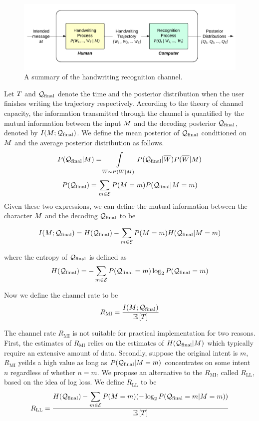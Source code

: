 \documentclass{sigchi}
\begin{document}
\begin{figure}
  \centering
  \includegraphics[width=0.9\columnwidth]{figures/hwr_channel.pdf}
  \caption{A summary of the handwriting recognition channel.}
  \label{fig:hwr_channel}
\end{figure}

Let $T$ and $\mathcal{Q}_{\mathrm{final}}$ denote the time and the posterior
distribution when the user finishes writing the trajectory
respectively.  According to the theory of channel capacity, the
information transmitted through the channel is quantified by the
mutual information between the input $M$ and the decoding
posterior $\mathcal{Q}_{\mathrm{final}}$, denoted by $I(M ; \mathcal{Q}_{\mathrm{final}})$. We
define the mean posterior of $\mathcal{Q}_{\mathrm{final}}$ conditioned on $M$ and
the average posterior distribution as follows.
\[
P(\mathcal{Q}_{\mathrm{final}} | M) =
\int\limits_{\overline{W} \sim P(\overline{W} | M)} { P(\mathcal{Q}_{\mathrm{final}} | \overline{W})
P(\overline{W} | M)} 
\]
\[
P(\mathcal{Q}_{\mathrm{final}})
=
\sum_{m \in \mathcal{E}} 
P(M = m) P(\mathcal{Q}_{\mathrm{final}} | M = m)
\]
Given these two expressions, we can define the mutual information
between the character $M$ and the decoding $\mathcal{Q}_{\mathrm{final}}$ to be 
{
\small
\[
I(M ; \mathcal{Q}_{\mathrm{final}}) = 
H(\mathcal{Q}_{\mathrm{final}})
- \sum_{m \in \mathcal{E}} P(M = m) H(\mathcal{Q}_{\mathrm{final}} | M = m)
\]

}
where the entropy of $\mathcal{Q}_{\mathrm{final}}$ is defined as
\[
H(\mathcal{Q}_{\mathrm{final}}) = -\sum_{m \in \mathcal{E}} {
P(\mathcal{Q}_{\mathrm{final}} = m) \log_2 P(\mathcal{Q}_{\mathrm{final}} = m)}
\]

\newcommand{\RMI}{R_{\mathrm{MI}}}
\newcommand{\RLL}{R_{\mathrm{LL}}}

Now we define the channel rate to be 
\begin{align}
\label{eq:channel_rate}
\RMI
= 
\frac{I( \intent ;  \predFinal)}{\expectedDuration}
\end{align}

The channel rate $\RMI$ is not suitable for practical implementation
for two reasons. First, the estimates of $\RMI$ relies on the
estimates of $H(\mathcal{Q}_{\mathrm{final}} | M)$ which typically require an
extensive amount of data. Secondly, suppose the original intent is
$m$, $\RMI$ yeilds a high value as long as $P(\mathcal{Q}_{\mathrm{final}} | M =
m)$ concentrates on some intent $n$ regardless of whether $n = m$.  We
propose an alternative to the $\RMI$, called $\RLL$, based on the idea
of log loss. We define $\RLL$ to be
{ 
\scriptsize
\begin{align}
\label{eq:channel_rate_ll}
\RLL = \frac{H(\predFinal) 
 - \displaystyle\sum_{m \in \intentSet} P(\intent = m) (-\log_2 P(\predFinal = m | \intent = m))}{\expectedDuration}
\end{align}
}
\end{document}
